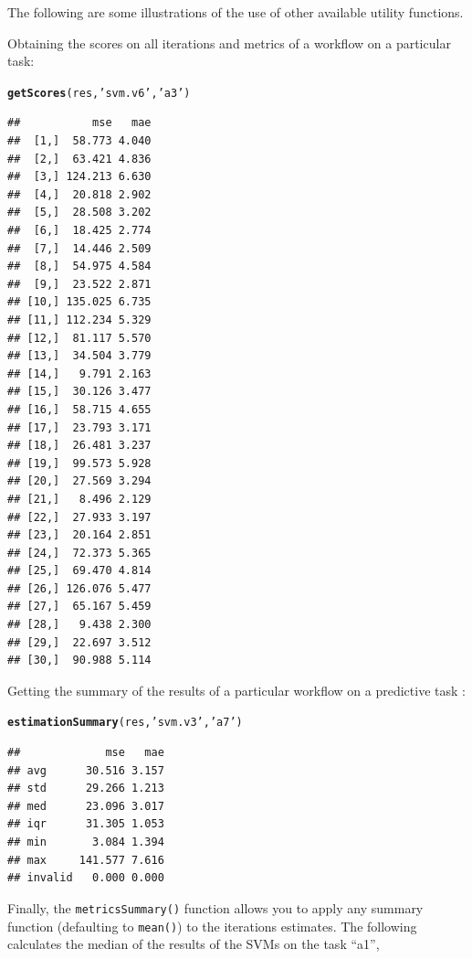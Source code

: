 \documentclass[10pt,a4paper]{article}\usepackage[]{graphicx}\usepackage[]{color}
\makeatletter
\newcommand{\hlstr}[1]{\textcolor[rgb]{0.192,0.494,0.8}{#1}}%
\newcommand{\hlstd}[1]{\textcolor[rgb]{0.345,0.345,0.345}{#1}}%
\newcommand{\hlkwd}[1]{\textcolor[rgb]{0.737,0.353,0.396}{\textbf{#1}}}%
\newenvironment{kframe}{%
 \def\at@end@of@kframe{}%
 \ifinner\ifhmode%
  \def\at@end@of@kframe{\end{minipage}}%
  \begin{minipage}{\columnwidth}%
 \fi\fi%
 \def\FrameCommand##1{\hskip\@totalleftmargin \hskip-\fboxsep
 \colorbox{shadecolor}{##1}\hskip-\fboxsep
     \hskip-\linewidth \hskip-\@totalleftmargin \hskip\columnwidth}%
 \MakeFramed {\advance\hsize-\width
   \@totalleftmargin\z@ \linewidth\hsize
   \@setminipage}}%
 {\par\unskip\endMakeFramed%
 \at@end@of@kframe}
\newenvironment{knitrout}{}{} %
\makeatother
\begin{document}
The following are some illustrations of the use of other available
utility functions.

Obtaining the scores on all iterations and metrics of a workflow on a
particular task:

\begin{knitrout}\footnotesize
{}\color{fgcolor}\begin{kframe}
\begin{alltt}
\hlkwd{getScores}\hlstd{(res,} \hlstr{'svm.v6'}\hlstd{,}\hlstr{'a3'}\hlstd{)}
\end{alltt}
\begin{verbatim}
##           mse   mae
##  [1,]  58.773 4.040
##  [2,]  63.421 4.836
##  [3,] 124.213 6.630
##  [4,]  20.818 2.902
##  [5,]  28.508 3.202
##  [6,]  18.425 2.774
##  [7,]  14.446 2.509
##  [8,]  54.975 4.584
##  [9,]  23.522 2.871
## [10,] 135.025 6.735
## [11,] 112.234 5.329
## [12,]  81.117 5.570
## [13,]  34.504 3.779
## [14,]   9.791 2.163
## [15,]  30.126 3.477
## [16,]  58.715 4.655
## [17,]  23.793 3.171
## [18,]  26.481 3.237
## [19,]  99.573 5.928
## [20,]  27.569 3.294
## [21,]   8.496 2.129
## [22,]  27.933 3.197
## [23,]  20.164 2.851
## [24,]  72.373 5.365
## [25,]  69.470 4.814
## [26,] 126.076 5.477
## [27,]  65.167 5.459
## [28,]   9.438 2.300
## [29,]  22.697 3.512
## [30,]  90.988 5.114
\end{verbatim}
\end{kframe}
\end{knitrout}

Getting the summary of the results of a particular workflow on a  predictive task :

\begin{knitrout}\footnotesize
{}\color{fgcolor}\begin{kframe}
\begin{alltt}
\hlkwd{estimationSummary}\hlstd{(res,}\hlstr{'svm.v3'}\hlstd{,} \hlstr{'a7'}\hlstd{)}
\end{alltt}
\begin{verbatim}
##             mse   mae
## avg      30.516 3.157
## std      29.266 1.213
## med      23.096 3.017
## iqr      31.305 1.053
## min       3.084 1.394
## max     141.577 7.616
## invalid   0.000 0.000
\end{verbatim}
\end{kframe}
\end{knitrout}

Finally, the \texttt{metricsSummary()} function allows you to apply any
summary function (defaulting to \texttt{mean()}) to the iterations estimates. The following
calculates the median of the results of the SVMs on the task ``a1'',
\end{document}
